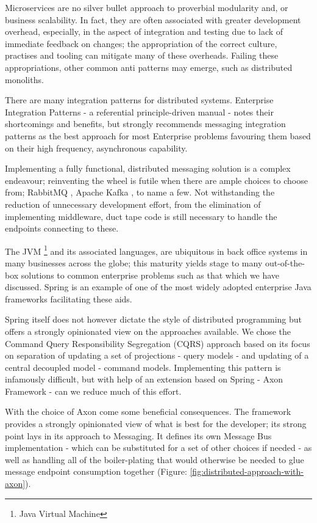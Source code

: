 Microservices are no silver bullet approach to proverbial modularity and, or business scalability. In fact, they are often associated with greater development overhead, especially, in the aspect of integration and testing due to lack of immediate feedback on changes; the appropriation of the correct culture, practises and tooling can mitigate many of these overheads. Failing these appropriations, other common anti patterns may emerge, such as distributed monoliths. 

There are many integration patterns for distributed systems. Enterprise Integration Patterns \parencite{hohpe2004enterprise} - a referential principle-driven manual - notes their shortcomings and benefits, but strongly recommends messaging integration patterns as the best approach for most Enterprise problems favouring them based on their high frequency, asynchronous capability.

Implementing a fully functional, distributed messaging solution is a complex endeavour; reinventing the wheel is futile when there are ample choices to choose from; RabbitMQ \parencite{rabbitMQ}, Apache Kafka \parencite{apacheKafka}, to name a few. Not withstanding the reduction of unnecessary development effort, from the elimination of implementing middleware, duct tape code is still necessary to handle the endpoints connecting to these.

The JVM \footnote{Java Virtual Machine} and its associated languages, are ubiquitous in back office systems in many businesses across the globe; this maturity yields stage to many out-of-the-box solutions to common enterprise problems such as that which we have discussed. Spring \parencite{springFramework} is an example of one of the most widely adopted enterprise Java frameworks facilitating these aids.

Spring itself does not however dictate the style of distributed programming but offers a strongly opinionated view on the approaches available. We chose the Command Query Responsibility Segregation (CQRS) \parencite{cqrs} approach based on its focus on separation of updating a set of projections - query models - and updating of a central decoupled model - command models. Implementing this pattern is infamously difficult, but with help of an extension based on Spring - Axon Framework \parencite{axonIQFramework} - can we reduce much of this effort.  

With the choice of Axon come some beneficial consequences. The framework provides a strongly opinionated view of what is best for the developer; its strong point lays in its approach to Messaging. It defines its own Message Bus implementation - which can be substituted for a set of other choices if needed - as well as handling all of the boiler-plating that would otherwise be needed to glue message endpoint consumption together (Figure: \ref{fig:distributed-approach-with-axon}).


